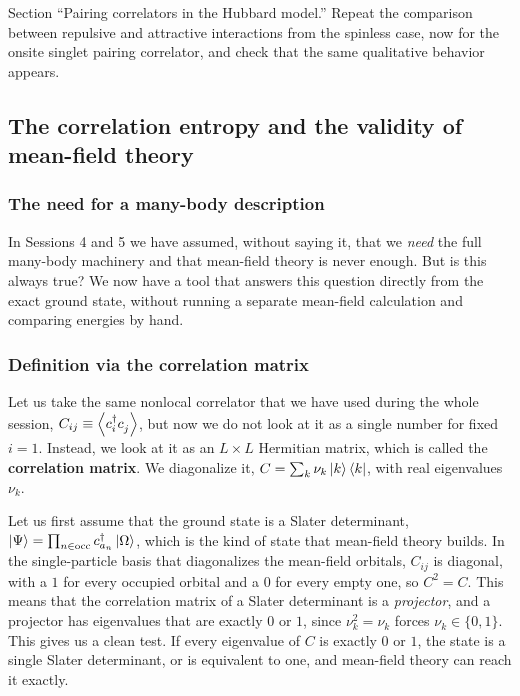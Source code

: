 \documentclass[lecture_notes.tex]{subfiles}
\begin{document}
\begin{notebook}
Section ``Pairing correlators in the Hubbard model.'' Repeat the comparison between repulsive and
attractive interactions from the spinless case, now for the onsite singlet pairing correlator, and
check that the same qualitative behavior appears.
\end{notebook}

\subsection{The correlation entropy and the validity of mean-field theory}
\label{sec:corrent}

\subsubsection{The need for a many-body description}
In Sessions 4 and 5 we have assumed, without saying it, that we \emph{need} the full many-body
machinery and that mean-field theory is never enough. But is this always true? We now have a tool
that answers this question directly from the exact ground state, without running a separate
mean-field calculation and comparing energies by hand.

\subsubsection{Definition via the correlation matrix}
Let us take the same nonlocal correlator that we have used during the whole session,
$C_{ij} \equiv
\expval{\cre{i}\ann{j}}$, but now we do not look at it as a single number for fixed $i=1$. Instead,
we look at it as an $L\times L$ Hermitian matrix, which is called the \textbf{correlation matrix}.
We diagonalize it, $C = \sum_k \nu_k \ket{k}\bra{k}$, with real eigenvalues $\nu_k$.

Let us first assume that the ground state is a Slater determinant, $\ket{\Psi} = \prod_{n\in\mathrm{occ}}
c^{\dagger}_{a_n}\ket{\Omega}$, which is the kind of state that mean-field theory builds. In the single-particle
basis that diagonalizes the mean-field orbitals, $C_{ij}$ is diagonal, with a $1$ for every occupied
orbital and a $0$ for every empty one, so $C^2=C$. This means that the correlation matrix of a
Slater determinant is a \emph{projector}, and a projector has eigenvalues that are exactly $0$ or
$1$, since $\nu_k^2=\nu_k$ forces $\nu_k\in\{0,1\}$. This gives us a clean test. If every eigenvalue
of $C$ is exactly $0$ or $1$, the state is a single Slater determinant, or is equivalent to one, and
mean-field theory can reach it exactly.
\end{document}
